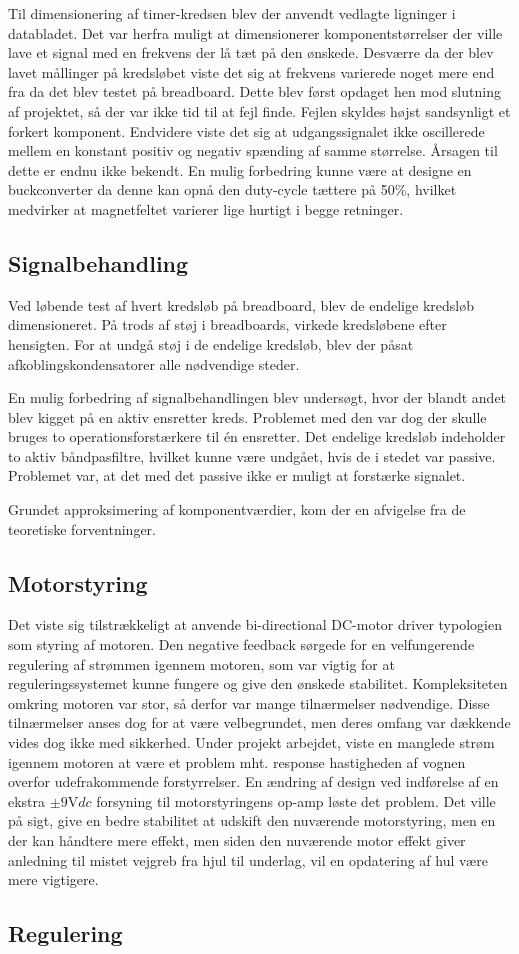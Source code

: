 Til dimensionering af timer-kredsen blev der anvendt vedlagte ligninger i databladet.
Det var herfra muligt at dimensionerer komponentstørrelser der ville lave et signal med en frekvens der lå tæt på den ønskede.
Desværre da der blev lavet mållinger på kredsløbet viste det sig at frekvens varierede noget mere end fra da det blev testet på breadboard.
Dette blev først opdaget hen mod slutning af projektet, så der var ikke tid til at fejl finde.
Fejlen skyldes højst sandsynligt et forkert komponent.
Endvidere viste det sig at udgangssignalet ikke oscillerede mellem en konstant positiv og negativ spænding af samme størrelse.
Årsagen til dette er endnu ikke bekendt.
En mulig forbedring kunne være at designe en buckconverter da denne kan opnå den duty-cycle tættere på 50\%, hvilket medvirker at magnetfeltet varierer lige hurtigt i begge retninger.

\subsection{Signalbehandling}
Ved løbende test af hvert kredsløb på breadboard, blev de endelige kredsløb dimensioneret. På trods af støj i breadboards, virkede kredsløbene efter hensigten. For at undgå støj i de endelige kredsløb, blev der påsat afkoblingskondensatorer alle nødvendige steder.

En mulig forbedring af signalbehandlingen blev undersøgt, hvor der blandt andet blev kigget på en aktiv ensretter kreds. Problemet med den var dog der skulle bruges to operationsforstærkere til én ensretter. Det endelige kredsløb indeholder to aktiv båndpasfiltre, hvilket kunne være undgået, hvis de i stedet var passive. Problemet var, at det med det passive ikke er muligt at forstærke signalet.

Grundet approksimering af komponentværdier, kom der en afvigelse fra de teoretiske forventninger.



\subsection{Motorstyring}
Det viste sig tilstrækkeligt at anvende bi-directional DC-motor driver typologien som styring af motoren. 
Den negative feedback sørgede for en velfungerende regulering af strømmen igennem motoren, som var vigtig for at reguleringssystemet kunne fungere og give den ønskede stabilitet.
Kompleksiteten omkring motoren var stor, så derfor var mange tilnærmelser nødvendige.
Disse tilnærmelser anses dog for at være velbegrundet, men deres omfang var dækkende vides dog ikke med sikkerhed.
Under projekt arbejdet, viste en manglede strøm igennem motoren at være et problem mht. response hastigheden af vognen overfor udefrakommende forstyrrelser.     
En ændring af design ved indførelse af en ekstra $\pm 9 \si{\volt}dc$ forsyning til motorstyringens op-amp løste det problem.
Det ville på sigt, give en bedre stabilitet at udskift den nuværende motorstyring, men en der kan håndtere mere effekt, men siden den nuværende motor effekt giver anledning til mistet vejgreb fra hjul til underlag, vil en opdatering af hul være mere vigtigere. 


\subsection{Regulering}




